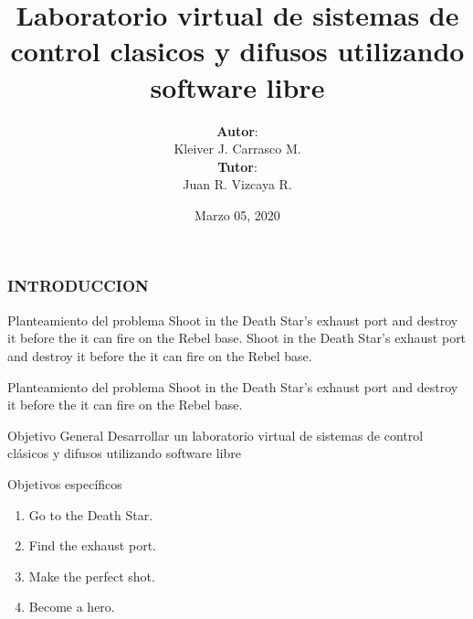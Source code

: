 \documentclass[usenames,dvipsnames]{beamer}
\title[Universidad Nacional Experimental del Tachira]{Laboratorio virtual de sistemas de control clasicos y difusos utilizando software libre}
\date[Marzo 2020]{Marzo 05, 2020}
\author[Proyecto Especial de Grado]{
  \textbf{Autor}: \hfill \\ Kleiver J. Carrasco M. \\ \vspace{10pt} \textbf{Tutor}: \\ Juan R. Vizcaya R.
}
\institute{
	Universidad Nacional Experimental del Tachira

	Vicerrectorado Academico
	
	Decanato de Docencia
	
Departamento de Electronica
}
\begin{document}
\begin{frame}
	\titlepage
\end{frame}

\begin{frame}
	\frametitle{INTRODUCCION}
	
	\begin{block}{Planteamiento del problema}
		Shoot in the Death Star's exhaust port and destroy it before the it can fire on the Rebel base.
		Shoot in the Death Star's exhaust port and destroy it before the it can fire on the Rebel base.
	\end{block}
 
	\begin{block}{Planteamiento del problema}
		Shoot in the Death Star's exhaust port and destroy it before the it can fire on the Rebel base.
	\end{block} 
\end{frame}

\begin{frame}
	
	\begin{block}{Objetivo General}
		Desarrollar un laboratorio virtual de sistemas de control clásicos y difusos utilizando software libre
	\end{block}
	
	\begin{block}{Objetivos específicos}
		\begin{enumerate} 
			\item Go to the Death Star.
			\item Find the exhaust port.
			\item Make the perfect shot.
			\item Become a hero.
		\end{enumerate}
	\end{block}
	
\end{frame}
\end{document}
